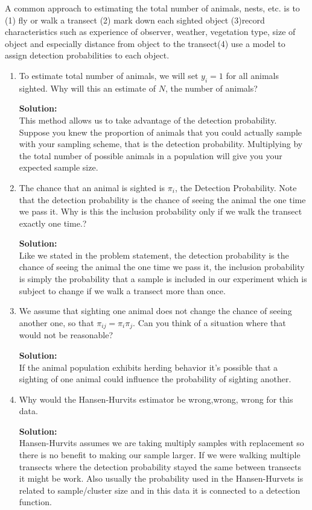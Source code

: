 \documentclass[12pt]{article}
\makeatletter
\theoremstyle{homework}
\newenvironment{exercise}[1]
{\def\@currentlabel{#1}\exercisecore}
{\endexercisecore}
\newcommand{\localhead}[1]{\par\smallskip\noindent\textbf{#1}\nobreak\\}%
\newcommand\solution{\localhead{Solution:}}
\makeatother
\begin{document}
\begin{exercise}{1} A common approach to estimating the total number of animals, 
  nests, etc. is to (1) fly or walk a transect (2) mark down each sighted object 
  (3)record characteristics such as experience of observer, weather, vegetation 
  type, size of object and especially distance from object to the transect(4) use a 
  model to assign detection probabilities to each object.\\
  \begin{enumerate}
    \item To estimate total number of animals, we will set $y_i = 1$ for all animals sighted. Why will this 
    an estimate of $N$, the number of animals?\\
    \solution This method allows us to take advantage of the detection probability. Suppose you knew the proportion of animals that 
    you could actually sample with your sampling scheme, that is the detection probability. Multiplying by the total number of possible animals 
    in a population will give you your expected sample size.\\
  \vspace{.15in}


  \item The chance that an animal is sighted is $\pi_i$, the Detection Probability. Note that the detection probability is the 
  chance of seeing the animal the one time we pass it. Why is this the inclusion probability only if we walk the transect exactly one time.?\\
  \solution Like we stated in the problem statement, the detection probability is the chance of seeing the animal the one time we pass it, the inclusion 
  probability is simply the probability that a sample is included in our experiment which is subject to change if we walk a transect more than once. 
  \vspace{.15in}
  
  \item We assume that sighting one animal does not change the chance of seeing another one, so that $\pi_{ij} = \pi_i\pi_j$. Can you think of a 
  situation where that would not be reasonable?\\
  \solution If the animal population exhibits herding behavior it's possible that a sighting of one animal could influence the probability of 
  sighting another. 
  \vspace{.15in}

  \item Why would the Hansen-Hurvits estimator be wrong,wrong, wrong for this data.\\
  \solution Hansen-Hurvits assumes we are taking multiply samples with replacement so there is no benefit to 
  making our sample larger. If we were walking multiple transects where the detection probability stayed the same between 
  transects it might be work. Also usually the probability used in the Hansen-Hurvets is related to sample/cluster size 
  and in this data it is connected to a detection function. 
  \vspace{.15in}
  

\end{enumerate}
\end{exercise}
\end{document}
